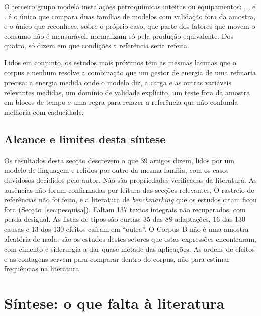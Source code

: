 O terceiro grupo modela instalações petroquímicas inteiras ou equipamentos:
\textcite{Hamedi2019}, \textcite{Ochoa2017}, \textcite{Morales2018} e
\textcite{Beisheim2020}. \textcite{Hamedi2019} é o único que compara duas
famílias de modelos com validação fora da amostra, e o único que reconhece,
sobre o próprio caso, que parte dos fatores que movem o consumo não é
mensurável. \textcite{Ochoa2017} normalizam só pela produção equivalente. Dos quatro,
só \textcite{Beisheim2020} dizem em que condições a referência seria
refeita.

Lidos em conjunto, os estudos mais próximos têm as mesmas lacunas que o
corpus e nenhum resolve a combinação que um gestor de energia de uma
refinaria precisa: a energia medida onde o modelo diz, a carga e as outras
variáveis relevantes medidas, um domínio de validade explícito, um teste
fora da amostra em blocos de tempo e uma regra para refazer a referência que
não confunda melhoria com caducidade.

\subsection{Alcance e limites desta síntese}

Os resultados desta secção descrevem o que 39 artigos dizem, lidos por um
modelo de linguagem e relidos por outro da mesma família, com os casos
duvidosos decididos pelo autor. Não são propriedades verificadas da
literatura. As ausências não foram confirmadas por leitura das secções
relevantes,  O rastreio de referências não foi feito, e a
literatura de \emph{benchmarking} que os estudos citam ficou fora
(Secção~\ref{sec:pesquisa}). Faltam 137 textos integrais não recuperados, com
perda desigual. As listas de tipos são curtas: 35 das 88 adaptações, 16 das
130 causas e 13 dos 130 efeitos caíram em ``outra''. O Corpus~B não é uma
amostra aleatória de nada: são os estudos destes setores que estas expressões
encontraram, com cimento e siderurgia a dar quase metade das aplicações. As
ordens de efeitos e as contagens servem para comparar dentro do corpus, não
para estimar frequências na literatura.

\section{Síntese: o que falta à literatura}
\label{sec:gap}

